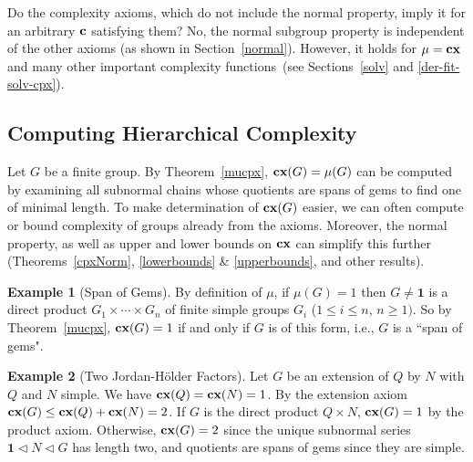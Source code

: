 \documentclass[a4paper,11pt]{amsart}
\theoremstyle{definition}
\newtheorem{example}{Example}
\newcommand{\cx}{\mbox{\bf cx}}
\renewcommand{\c}{\mbox{\bf c}}
\newcommand{\1}{{\mathbf 1}}
\begin{document}
Do the complexity axioms, which do not include the normal property, imply it for an arbitrary $\c$ satisfying them? 
No, the normal subgroup property is independent of the other axioms (as shown in Section~\ref{normal}). However, it holds  for $\mu=\cx$ and many other important complexity functions~(see Sections~\ref{solv} and \ref{der-fit-solv-cpx}).  



\subsection{Computing Hierarchical Complexity}


Let $G$ be a finite group. By Theorem~\ref{mucpx},  $\cx(G)=\mu(G)$ can be computed by examining all subnormal chains whose quotients are spans of gems to find one of minimal length.  
To make determination of $\cx(G)$ easier,  we can often compute or bound complexity of groups already from the axioms. 
Moreover, the normal property, as well as upper and lower bounds on $\cx$ can simplify this further (Theorems~\ref{cpxNorm}, \ref{lowerbounds}   \& \ref{upperbounds}, and other results).



\begin{example}[Span of Gems]
By definition of $\mu$,  if $\mu(G)=1$ then $G\neq \1$ is  a direct product  $G_1 \times \cdots\times G_n$  of finite simple groups $G_i$ ($1\leq i \leq  n$, $n\geq 1)$. 
So by Theorem~\ref{mucpx}, $\cx(G)=1$ if and only if $G$ is of this form, i.e., $G$ is a ``span of gems". 

\end{example}







\begin{example}[Two Jordan-H\"older Factors]\label{2JH}
 Let $G$ be an extension of $Q$ by $N$ with $Q$ and $N$ simple. We have $\cx(Q)=\cx(N)=1$.   By the extension axiom $\cx(G) \leq \cx(Q) + \cx(N)=2$.  
  If $G$ is the direct product $Q \times N$, $\cx(G)=1$ by the
product axiom.  Otherwise, $\cx(G)=2$ since the unique subnormal series  $\1 \lhd N \lhd G$ has length two, and quotients are spans of gems since they are simple.
\end{example}
\end{document}
